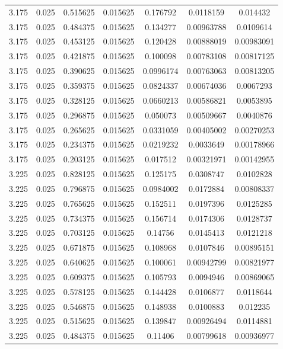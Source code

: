 \begin{flushleft}
\begin{longtable}{ccccccc}
3.175 & 0.025 & 0.515625 & 0.015625 & 0.176792 & 0.0118159 & 0.014432  \\ 
3.175 & 0.025 & 0.484375 & 0.015625 & 0.134277 & 0.00963788 & 0.0109614  \\ 
3.175 & 0.025 & 0.453125 & 0.015625 & 0.120428 & 0.00888019 & 0.00983091  \\ 
3.175 & 0.025 & 0.421875 & 0.015625 & 0.100098 & 0.00783108 & 0.00817125  \\ 
3.175 & 0.025 & 0.390625 & 0.015625 & 0.0996174 & 0.00763063 & 0.00813205  \\ 
3.175 & 0.025 & 0.359375 & 0.015625 & 0.0824337 & 0.00674036 & 0.0067293  \\ 
3.175 & 0.025 & 0.328125 & 0.015625 & 0.0660213 & 0.00586821 & 0.0053895  \\ 
3.175 & 0.025 & 0.296875 & 0.015625 & 0.050073 & 0.00509667 & 0.0040876  \\ 
3.175 & 0.025 & 0.265625 & 0.015625 & 0.0331059 & 0.00405002 & 0.00270253  \\ 
3.175 & 0.025 & 0.234375 & 0.015625 & 0.0219232 & 0.0033649 & 0.00178966  \\ 
3.175 & 0.025 & 0.203125 & 0.015625 & 0.017512 & 0.00321971 & 0.00142955  \\ 
3.225 & 0.025 & 0.828125 & 0.015625 & 0.125175 & 0.0308747 & 0.0102828  \\ 
3.225 & 0.025 & 0.796875 & 0.015625 & 0.0984002 & 0.0172884 & 0.00808337  \\ 
3.225 & 0.025 & 0.765625 & 0.015625 & 0.152511 & 0.0197396 & 0.0125285  \\ 
3.225 & 0.025 & 0.734375 & 0.015625 & 0.156714 & 0.0174306 & 0.0128737  \\ 
3.225 & 0.025 & 0.703125 & 0.015625 & 0.14756 & 0.0145413 & 0.0121218  \\ 
3.225 & 0.025 & 0.671875 & 0.015625 & 0.108968 & 0.0107846 & 0.00895151  \\ 
3.225 & 0.025 & 0.640625 & 0.015625 & 0.100061 & 0.00942799 & 0.00821977  \\ 
3.225 & 0.025 & 0.609375 & 0.015625 & 0.105793 & 0.0094946 & 0.00869065  \\ 
3.225 & 0.025 & 0.578125 & 0.015625 & 0.144428 & 0.0106877 & 0.0118644  \\ 
3.225 & 0.025 & 0.546875 & 0.015625 & 0.148938 & 0.0100883 & 0.012235  \\ 
3.225 & 0.025 & 0.515625 & 0.015625 & 0.139847 & 0.00926494 & 0.0114881  \\ 
3.225 & 0.025 & 0.484375 & 0.015625 & 0.11406 & 0.00799618 & 0.00936977  \\ 

\end{longtable}
\end{flushleft}
